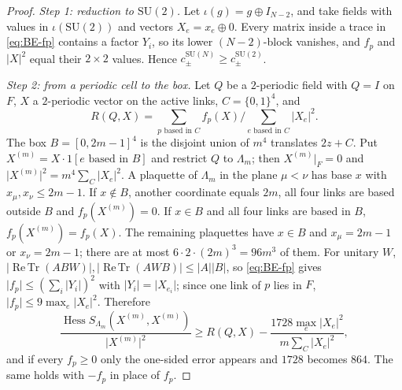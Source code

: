 \documentclass[11pt,a4paper]{amsart}
\theoremstyle{definition}
\theoremstyle{remark}
\numberwithin{equation}{section}
\DeclareMathOperator{\ReTr}{Re\,Tr}  %
\DeclareMathOperator{\Hess}{Hess}    %
\newcommand{\abs}[1]{\lvert #1\rvert}      %
\newcommand{\SU}{\mathrm{SU}}              %
\begin{document}
\begin{proof}
\emph{Step 1: reduction to $\SU(2)$.} Let $\iota(g)=g\oplus I_{N-2}$, and take fields with values in $\iota(\SU(2))$ and vectors $X_e=x_e\oplus0$. Every matrix inside a trace in \eqref{eq:BE-fp} contains a factor $Y_i$, so its lower $(N-2)$-block vanishes, and $f_p$ and $\abs X^2$ equal their $2\times2$ values. Hence $c^{\SU(N)}_\pm\ge c^{\SU(2)}_\pm$.

\emph{Step 2: from a periodic cell to the box.} Let $Q$ be a $2$-periodic field with $Q=I$ on $F$, $X$ a $2$-periodic vector on the active links, $C=\{0,1\}^4$, and
\[
R(Q,X)=\sum_{p\text{ based in }C}f_p(X)\Big/\sum_{e\text{ based in }C}\abs{X_e}^2 .
\]
The box $B=[0,2m-1]^4$ is the disjoint union of $m^4$ translates $2z+C$. Put $X^{(m)}=X\cdot1[e\text{ based in }B]$ and restrict $Q$ to $\Lambda_m$; then $X^{(m)}|_F=0$ and $\abs{X^{(m)}}^2=m^4\sum_C\abs{X_e}^2$. A plaquette of $\Lambda_m$ in the plane $\mu<\nu$ has base $x$ with $x_\mu,x_\nu\le2m-1$. If $x\notin B$, another coordinate equals $2m$, all four links are based outside $B$ and $f_p(X^{(m)})=0$. If $x\in B$ and all four links are based in $B$, $f_p(X^{(m)})=f_p(X)$. The remaining plaquettes have $x\in B$ and $x_\mu=2m-1$ or $x_\nu=2m-1$; there are at most $6\cdot2\cdot(2m)^3=96m^3$ of them. For unitary $W$, $\abs{\ReTr(ABW)},\abs{\ReTr(AWB)}\le\abs A\abs B$, so \eqref{eq:BE-fp} gives $\abs{f_p}\le(\sum_i\abs{Y_i})^2$ with $\abs{Y_i}=\abs{X_{e_i}}$; since one link of $p$ lies in $F$, $\abs{f_p}\le9\max_e\abs{X_e}^2$. Therefore
\[
\frac{\Hess S_{\Lambda_m}(X^{(m)},X^{(m)})}{\abs{X^{(m)}}^2}\ge R(Q,X)-\frac{1728\max_e\abs{X_e}^2}{m\sum_C\abs{X_e}^2},
\]
and if every $f_p\ge0$ only the one-sided error appears and $1728$ becomes $864$. The same holds with $-f_p$ in place of $f_p$.


\end{proof}
\end{document}
